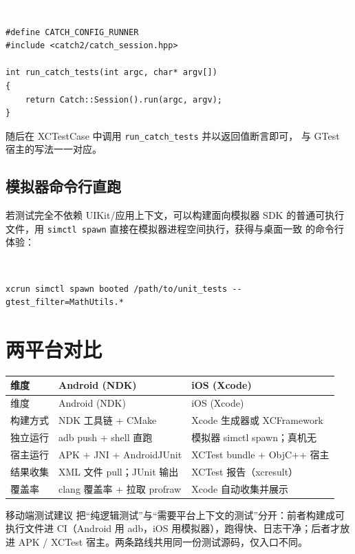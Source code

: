 \documentclass[12pt,a4paper,fontset=fandol]{ctexbook}
\newcommand{\cpplabel}{%
  \begin{tcolorbox}[enhanced,colback=cppheadbg,colframe=cppheadbg,
    arc=1mm,boxrule=0mm,left=6pt,right=6pt,top=2pt,bottom=2pt,
    halign=left,oversize]
    \textcolor{white}{\small\bfseries C++}
  \end{tcolorbox}\vspace{-4pt}}
\newcommand{\bashlabel}{%
  \begin{tcolorbox}[enhanced,colback=black!80,colframe=black!80,
    arc=1mm,boxrule=0mm,left=6pt,right=6pt,top=2pt,bottom=2pt,
    halign=left,oversize]
    \textcolor{white}{\small\bfseries Shell}
  \end{tcolorbox}\vspace{-4pt}}
\begin{document}
\cpplabel
\begin{lstlisting}
#define CATCH_CONFIG_RUNNER
#include <catch2/catch_session.hpp>

int run_catch_tests(int argc, char* argv[])
{
    return Catch::Session().run(argc, argv);
}
\end{lstlisting}

随后在 XCTestCase 中调用 \texttt{run\_catch\_tests} 并以返回值断言即可，
与 GTest 宿主的写法一一对应。

\subsection{模拟器命令行直跑}

若测试完全不依赖 UIKit/应用上下文，可以构建面向模拟器 SDK 的普通可执行
文件，用 \texttt{simctl spawn} 直接在模拟器进程空间执行，获得与桌面一致
的命令行体验：

\bashlabel
\begin{lstlisting}
xcrun simctl spawn booted /path/to/unit_tests --gtest_filter=MathUtils.*
\end{lstlisting}

\section{两平台对比}

{
\scriptsize
\setlength{\tabcolsep}{3pt}
\begin{longtable}{p{2.6cm}p{5.6cm}p{5.6cm}}
\toprule
维度 & Android (NDK) & iOS (Xcode) \\
\midrule
\endfirsthead
\toprule
维度 & Android (NDK) & iOS (Xcode) \\
\midrule
\endhead
构建方式 & NDK 工具链 + CMake & Xcode 生成器或 XCFramework \\
独立运行 & adb push + shell 直跑 & 模拟器 simctl spawn；真机无 \\
宿主运行 & APK + JNI + AndroidJUnit & XCTest bundle + ObjC++ 宿主 \\
结果收集 & XML 文件 pull；JUnit 输出 & XCTest 报告（xcresult） \\
覆盖率 & clang 覆盖率 + 拉取 profraw & Xcode 自动收集并展示 \\
\bottomrule
\end{longtable}
}

\begin{bestpractice}{移动端测试建议}
把“纯逻辑测试”与“需要平台上下文的测试”分开：前者构建成可执行文件进
CI（Android 用 adb，iOS 用模拟器），跑得快、日志干净；后者才放进 APK /
XCTest 宿主。两条路线共用同一份测试源码，仅入口不同。
\end{bestpractice}
\end{document}
